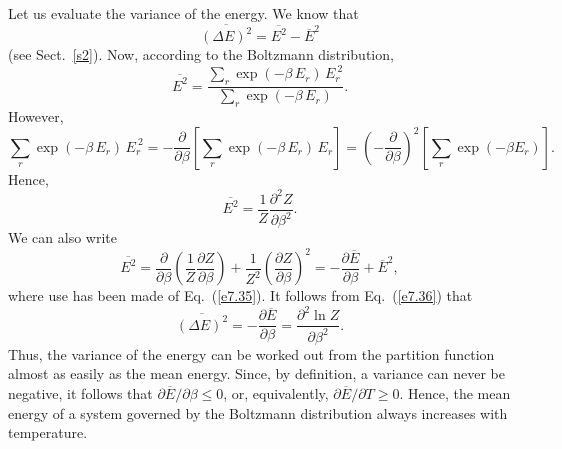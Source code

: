 Let us evaluate the variance of the energy. We know
that
\begin{equation}
\overline{(\Delta E)^2} = \overline{E^2} - \overline{E}^2\label{e7.36}
\end{equation}
(see Sect.~\ref{s2}). 
Now, according to the Boltzmann distribution,
\begin{equation}
\overline{E^2} = \frac{\sum_r \exp(-\beta \,E_r)\, E_r^{~2}}{\sum_r \exp(-\beta \,E_r)}.
\end{equation}
However,
\begin{equation}
\sum_r \exp(-\beta \,E_r)\,E_r^{~2} = -\frac{\partial}
{\partial \beta} \!\left[\sum_r \exp(-\beta\, E_r)\,E_r\right]
=\left(-\frac{\partial}{\partial \beta}\right)^2\! \left[
\sum_r \exp(-\beta E_r)\right].
\end{equation}
Hence,
\begin{equation}
\overline{ E^2} = \frac{1}{Z} \frac{\partial^2 Z}{\partial \beta^2}.
\end{equation}
We can also write
\begin{equation}
\overline{ E^2} = \frac{\partial}{\partial \beta}\!\left(
\frac{1}{Z} \frac{\partial Z}{\partial \beta}\right) +\frac{1}{Z^2}\!\left(
\frac{\partial Z}{\partial \beta}\right)^2 = -\frac{\partial \overline{E}}{\partial 
\beta} + \overline{E}^2,
\end{equation}
where use has been made of Eq.~(\ref{e7.35}). It follows from Eq.~(\ref{e7.36}) that
\begin{equation}
\overline{(\Delta E)^2} = -\frac{\partial \overline{E}}{\partial \beta}
= \frac{\partial^2 \ln Z}{\partial \beta^2}.
\end{equation}
Thus, the variance of the energy can be worked out from the partition function
almost as easily as the mean energy. Since, by definition,
 a variance can never be negative, it
follows that $\partial \overline{E}/\partial \beta \leq 0$, or, equivalently,
$\partial \overline{E}/\partial T \geq 0$. Hence, the mean energy of a system
governed by the Boltzmann distribution always increases with temperature. 

